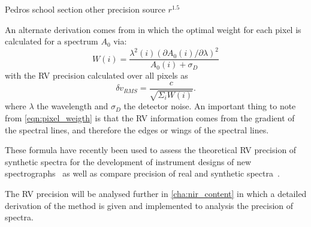 Pedros school section other precision source \({r}^{1.5}\)



An alternate derivation comes from \citet{bocuhy_fundamental_2001} in which the optimal weight for each pixel is calculated for a spectrum $A_0$ via:
\begin{equation}
    W(i) = \frac{\lambda^{2}(i) {(\partial A_0(i)/\partial\lambda)}^{2}}{A_0(i) + \sigma_D} \label{eqn:pixel_weigth}
\end{equation}
with the RV precision calculated over all pixels as
\begin{equation}
    \delta v_{RMS} = \frac{c}{\sqrt{\Sigma_i W(i)}}.
\end{equation}
where $\lambda$ the wavelength and $\sigma_D$ the detector noise. An important thing to note from \cref{eqn:pixel_weigth} is that the RV information comes from the gradient of the spectral lines, and therefore the edges or wings of the spectral lines.

These formula have recently been used to assess the theoretical RV precision of synthetic spectra for the development of instrument designs of new \nir{} spectrographs~\citep[e.g.][]{figueira_radial_2016} as well as compare precision of real and synthetic spectra~\citep[e.g.][]{artigau_optical_2018}.
 
The RV precision will be analysed further in \cref{cha:nir_content} in which a detailed derivation of the \citet{bouchy_fundamemtntal_2001} method is given and implemented to analysis the precision of \nir{} spectra.
